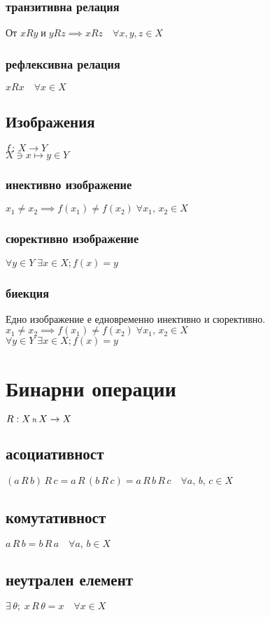 \documentclass{article}
\begin{document}
    \subsubsection{транзитивна релация}
    От \(xRy \; \text{и} \; yRz \implies xRz \quad \forall x, y, z \in X\)
    \subsubsection{рефлексивна релация}
    \(xRx \quad \forall x\in X\)
    \subsection{Изображения}
    \(f \, : \, X \to Y\)\\
    \(X \ni x \mapsto y \in Y\)
    \subsubsection{инективно изображение}
    \(x_1 \neq x_2 \implies f(x_1) \neq f(x_2) \; \forall x_1, \, x_2 \in X\)
    \subsubsection{сюрективно изображение}
    \(\forall y \in Y \; \exists x \in X ; f(x) = y\)
    \subsubsection{биекция}
    Едно изображение е едновременно инективно и сюрективно.\\
    \(x_1 \neq x_2 \implies f(x_1) \neq f(x_2) \; \forall x_1, \, x_2 \in X\)\\
    \(\forall y \in Y \; \exists x \in X ; f(x) = y\)
    \section{Бинарни операции}
    \(R: X \, \text{\tiny{R}} \, X \to X\)
    \subsection{асоциативност}
    \((a \, R \, b) \, R \, c = a \, R \, (b \, R \, c) = a \, R \, b \, R \, c \quad \forall a, \, b, \, c \in X\)
    \subsection{комутативност}
    \(a \, R \, b = b \, R \, a \quad \forall a, \, b \in X\)
    \subsection{неутрален елемент}
    \(\exists \, \theta; \; x \, R \, \theta = x \quad \forall x \in X\)
\end{document}

